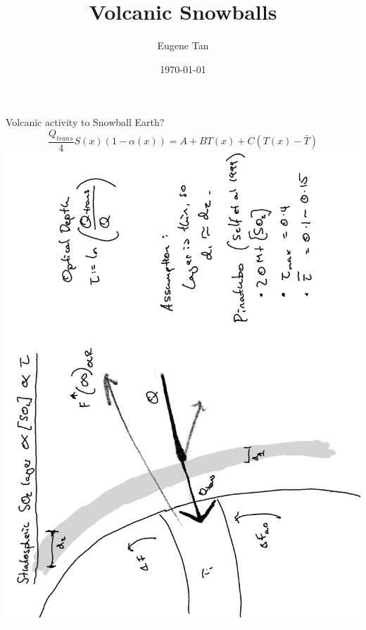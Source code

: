 \documentclass[11pt]{beamer}
\begin{document}

\title[Volcanic Snowball Earth]{Volcanic Snowballs}
\author{Eugene Tan}
\date{\today}


\begin{frame}{Volcanic activity to Snowball Earth?}
    $$\frac{Q_{trans}}{4} S(x)(1-\alpha(x)) = A + BT(x) + C (T(x)-\bar{T})$$
    \centering
    \includegraphics[width=.7\textwidth,height=\textheight,keepaspectratio, angle=-90]{img/graph.png}
\end{frame}
\end{document}
